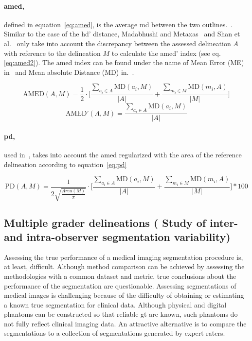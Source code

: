 \documentclass[authoryear,preprint,review,12pt]{elsarticle}
\begin{document}
\paragraph{\acf{amed},} defined in equation~\ref{eq:amed}, is the average \ac{md} between the two outlines.~\cite{Gao:2012p14336}. Similar to the case of the \ac{hd}' distance, Madabhushi and Metaxas~\cite{Madabhushi:2003p6036} and Shan et al.~\cite{Shan:2012p14347} only take into account the discrepancy between the assessed delineation $A$ with reference to the delineation $M$ to calculate the \ac{amed}' index (see eq.\,\ref{eq:amed2}). The \ac{amed} index can be found under the name of Mean Error (ME) in~\cite{Madabhushi:2003p6036} and Mean absolute Distance (MD) in.~\cite{Shan:2012p14347}.

\begin{equation}
\text{AMED} (A,M) = \frac{1}{2}  \cdot  \Bigg [ 
 \frac{ \sum_{a_i \in A} \text{MD}(a_i,M)}{|A|} + \frac{ \sum_{m_i \in M} \text{MD}(m_i,A) }{|M|} \Bigg ]
\label{eq:amed}
\end{equation}
\begin{equation}
\label{eq:amed2}
\text{AMED'} (A,M)= \frac{ \sum_{a_i \in A} \text{MD}(a_i,M)}{|A|}
\end{equation}

\paragraph{\ac{pd},} used in~\cite{AlemanFlores:2007p14310,Gomez:2010p14339}, takes into account the \ac{amed} regularized with the area of the reference delineation according to equation~\ref{eq:pd}

\begin{equation}
\text{PD} (A,M) = \frac{1}{2 \sqrt{\frac{Area(M)}{\pi}}} \cdot  \Bigg [ 
 \frac{ \sum_{a_i \in A} \text{MD}(a_i,M)}{|A|} + \frac{ \sum_{m_i \in M} \text{MD}(m_i,A) }{|M|} \Bigg ] * 100
\label{eq:pd}
\end{equation}

\subsection[Multiple grader delineations ]{Multiple grader delineations ( Study of inter- and intra-observer segmentation variability)}\label{sec:multipleGT}

Assessing the true performance of a medical imaging segmentation procedure is, at least, difficult. Although method comparison can be achieved by assessing the methodologies with a common dataset and metric, true conclusions about the performance of the segmentation are questionable. Assessing segmentations of medical images is challenging because of the difficulty of obtaining or estimating a known true segmentation for clinical data. Although physical and digital phantoms can be constructed so that reliable \ac{gt} are known, such phantoms do not fully reflect clinical imaging data. An attractive alternative is to compare the segmentations to a collection of segmentations generated by expert raters. 
\end{document}
